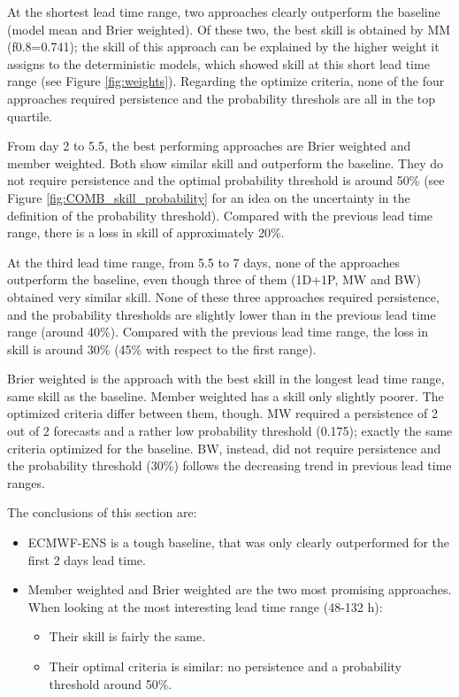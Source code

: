 \documentclass[preprint,12pt]{elsarticle}
\begin{document}
At the shortest lead time range, two approaches clearly outperform the baseline (model mean and Brier weighted). Of these two, the best skill is obtained by MM (f0.8=0.741); the skill of this approach can be explained by the higher weight it assigns to the deterministic models, which showed skill at this short lead time range (see Figure \ref{fig:weights}). Regarding the optimize criteria, none of the four approaches required persistence and the probability threshols are all in the top quartile.

From day 2 to 5.5, the best performing approaches are Brier weighted and member weighted. Both show similar skill and outperform the baseline. They do not require persistence and the optimal probability threshold is around 50\% (see Figure \ref{fig:COMB_skill_probability} for an idea on the uncertainty in the definition of the probability threshold). Compared with the previous lead time range, there is a loss in skill of approximately 20\%.

At the third lead time range, from 5.5 to 7 days, none of the approaches outperform the baseline, even though three of them (1D+1P, MW and BW) obtained very similar skill. None of these three approaches required persistence, and the probability thresholds are slightly lower than in the previous lead time range (around 40\%). Compared with the previous lead time range, the loss in skill is around 30\% (45\% with respect to the first range).

Brier weighted is the approach with the best skill in the longest lead time range, same skill as the baseline. Member weighted has a skill only slightly poorer. The optimized criteria differ between them, though. MW required a persistence of 2 out of 2 forecasts and a rather low probability threshold (0.175); exactly the same criteria optimized for the baseline. BW, instead, did not require persistence and the probability threshold (30\%) follows the decreasing trend in previous lead time ranges.

The conclusions of this section are:

\begin{itemize}
    \item ECMWF-ENS is a tough baseline, that was only clearly outperformed for the first 2 days lead time.
    \item Member weighted  and Brier weighted  are the two most promising approaches. When looking at the most interesting lead time range (48-132 h):
    \begin{itemize}
        \item Their skill is fairly the same.
        \item Their optimal criteria is similar: no persistence and a probability threshold around 50\%.
    \end{itemize}
\end{itemize}  
\end{document}
